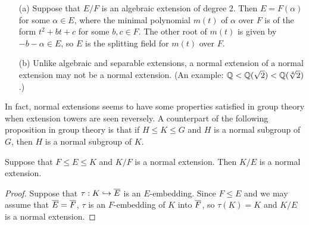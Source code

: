 \begin{exmp}
    \begin{enumerate}
        \item[(a)]
        {
            Suppose that $E/F$ is an algebraic extension of degree 2.
            Then $E=F(\alpha)$ for some $\alpha\in E$, where the minimal polynomial $m(t)$ of $\alpha$ over $F$ is of the form $t^2+bt+c$ for some $b, c\in F$.
            The other root of $m(t)$ is given by $-b-\alpha\in E$, so $E$ is the splitting field for $m(t)$ over $F$.
        }
        \item[(b)]
        {
            Unlike algebraic and separable extensions, a normal extension of a normal extension may not be a normal extension.
            (An example: ${\mathbb{Q}}<{\mathbb{Q}}(\sqrt{2})<{\mathbb{Q}}(\sqrt[4]{2})$.)
        }
    \end{enumerate}
\end{exmp}

In fact, normal extensions seems to have some properties satisfied in group theory when extension towers are seen reversely.
A counterpart of the following proposition in group theory is that if $H\leq K\leq G$ and $H$ is a normal subgroup of $G$, then $H$ is a normal subgroup of $K$.
\begin{prop}
    Suppose that $F\leq E\leq K$ and $K/F$ is a normal extension.
    Then $K/E$ is a normal extension.
\end{prop}
\begin{proof}
    Suppose that $\tau: K\hookrightarrow\overline{E}$ is an $E$-embedding.
    Since $F\leq E$ and we may assume that $\overline{E}=\overline{F}$, $\tau$ is an $F$-embedding of $K$ into $\overline{F}$, so $\tau(K)=K$ and $K/E$ is a normal extension.
\end{proof}

